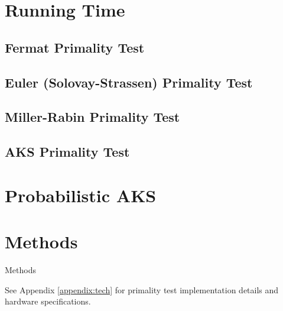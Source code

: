 \documentclass{article}
\begin{document}
\section{Running Time}

\subsection{Fermat Primality Test}

\subsection{Euler (Solovay-Strassen) Primality Test}

\subsection{Miller-Rabin Primality Test}

\subsection{AKS Primality Test}

\section{Probabilistic AKS}

\section{Methods}
Methods

See Appendix \ref{appendix:tech} for primality test implementation details and hardware specifications.
\end{document}

